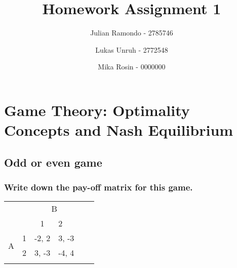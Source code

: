 \documentclass[11pt]{article}
\title{Homework Assignment 1}
\begin{document}
    \author{Julian Ramondo - 2785746 \and Lukas Unruh - 2772548 \and Mika Rosin - 0000000}
    \maketitle


    \section{Game Theory: Optimality Concepts and Nash Equilibrium}

    \subsection{Odd or even game}

    \subsubsection{Write down the pay-off matrix for this game.}
    \begin{table}[h]
        \centering
        \begin{tabular}{llllll}
            & & \multicolumn{2}{c}{B} & & \\
            &                        & \multicolumn{1}{c}{1}      & 2                          & & \\ \cline{3-4}
            \multirow{2}{*}{A} & \multicolumn{1}{r|}{1} & \multicolumn{1}{l|}{-2, 2} & \multicolumn{1}{l|}{3, -3} &  &  \\ \cline{3-4}
            & \multicolumn{1}{l|}{2} & \multicolumn{1}{l|}{3, -3} & \multicolumn{1}{l|}{-4, 4} & & \\ \cline{3-4}
            &                        &                            &                            & &
        \end{tabular}
    \end{table}
\end{document}

